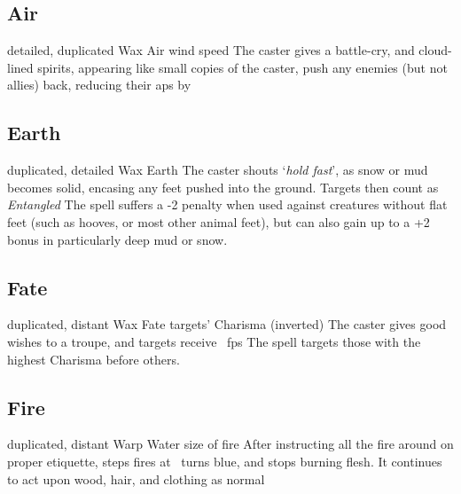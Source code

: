 \begin{multicols}{2}

\subsection{Air}

  {detailed, duplicated}%
  {Wax}%
  {Air}%
  {wind speed}%
  {The caster gives a battle-cry, and cloud-lined spirits, appearing like small copies of the caster, push any enemies (but not allies) back, reducing their \glspl{ap} by }%
  {}


\subsection{Earth}

  {duplicated, detailed}%
  {Wax}%
  {Earth}%
  {}%
  {The caster shouts `\textit{hold fast}', as snow or mud becomes solid, encasing any feet pushed into the ground.
  Targets then count as \textit{Entangled}}%
  {
  The spell suffers a -2 penalty when used against creatures without flat feet (such as hooves, or most other animal feet), but can also gain up to a +2 bonus in particularly deep mud or snow.}


\subsection{Fate}

  {duplicated, distant}%
  {Wax}%
  {Fate}%
  {targets' Charisma (inverted)}%
  {The caster gives good wishes to a troupe, and  targets receive \showDam~\glspl{fp}}%
  {The spell targets those with the highest Charisma before others.}


\subsection{Fire}


  {duplicated, distant}%
  {Warp}%
  {Water}%
  {size of fire}%
  {After instructing all the fire around on proper etiquette,  \glspl{step} fires at \spellRange\ turns blue, and stops burning flesh.
  It continues to act upon wood, hair, and clothing as normal}%
  {}


\end{multicols}
